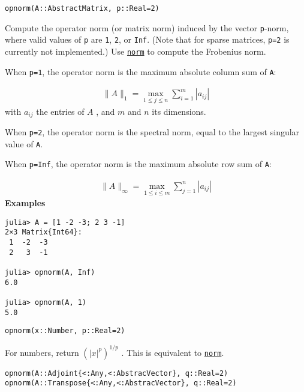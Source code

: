 \begin{adjustwidth}{2em}{0pt}


\begin{verbatim}
opnorm(A::AbstractMatrix, p::Real=2)
\end{verbatim}

Compute the operator norm (or matrix norm) induced by the vector \texttt{p}-norm, where valid values of \texttt{p} are \texttt{1}, \texttt{2}, or \texttt{Inf}. (Note that for sparse matrices, \texttt{p=2} is currently not implemented.) Use \hyperlink{898926013064269707}{\texttt{norm}} to compute the Frobenius norm.

When \texttt{p=1}, the operator norm is the maximum absolute column sum of \texttt{A}:

\begin{equation*}
\begin{split}\|A\|_1 = \max_{1 ≤ j ≤ n} \sum_{i=1}^m | a_{ij} |\end{split}\end{equation*}
with  \(a_{ij}\)  the entries of  \(A\) , and  \(m\)  and  \(n\)  its dimensions.

When \texttt{p=2}, the operator norm is the spectral norm, equal to the largest singular value of \texttt{A}.

When \texttt{p=Inf}, the operator norm is the maximum absolute row sum of \texttt{A}:

\begin{equation*}
\begin{split}\|A\|_\infty = \max_{1 ≤ i ≤ m} \sum _{j=1}^n | a_{ij} |\end{split}\end{equation*}
\textbf{Examples}


\begin{verbatim}
julia> A = [1 -2 -3; 2 3 -1]
2×3 Matrix{Int64}:
 1  -2  -3
 2   3  -1

julia> opnorm(A, Inf)
6.0

julia> opnorm(A, 1)
5.0
\end{verbatim}




\begin{lstlisting}
opnorm(x::Number, p::Real=2)
\end{lstlisting}

For numbers, return  \(\left( |x|^p \right)^{1/p}\) . This is equivalent to \hyperlink{898926013064269707}{\texttt{norm}}.




\begin{lstlisting}
opnorm(A::Adjoint{<:Any,<:AbstracVector}, q::Real=2)
opnorm(A::Transpose{<:Any,<:AbstracVector}, q::Real=2)
\end{lstlisting}


\end{adjustwidth}
